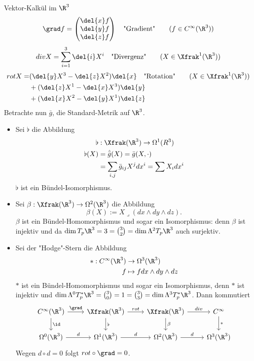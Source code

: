 \begin{rem}
	Vektor-Kalkül im $\R^3$\\
	\[ \grad f = \begin{pmatrix}
		\del{x}f \\ \del{y}f \\ \del{z}f
		\end{pmatrix} \quad \text{"Gradient"} \qquad (f \in C^\infty(\R^3)) \]
	\[ div X = \sum_{i=1}^3 \del{i} X^i \quad \text{"Divergenz"} \qquad (X \in \Xfrak^1(\R^3)) \]
	\begin{align*}
		rot X =& (\del{y}X^3 - \del{z}X^2) \del{x} \quad \text{"Rotation"} \qquad (X \in \Xfrak^1(\R^3))\\
		&+ (\del{z}X^1 - \del{x}X^3) \del{y}\\
		&+ (\del{x}X^2 - \del{y}X^1) \del{z}
	\end{align*}
	Betrachte nun $\bar{g}$, die Standard-Metrik auf $\R^3$.
	\begin{itemize}
		\item Sei $\flat$ die Abbildung
			\begin{align*}
				\flat&: \Xfrak(\R^3) \to \Omega^1(R^3)\\
				\flat(X) &= \hat{\bar{g}}(X) = \bar{g}(X,\cdot)\\
				&= \sum_{i,j} \bar{g}_{ij} X^j dx^i = \sum X_i dx^i
			\end{align*}
			$\flat$ ist ein Bündel-Isomorphismus.
		
		\item Sei $ \beta: \Xfrak(\R^3) \to \Omega^2(\R^3) $ die Abbildung
			\[ \beta(X):= X \lrcorner (dx \wedge dy \wedge dz). \]
			$\beta$ ist ein Bündel-Homomorphismus und sogar ein Isomorphismus: denn $\beta$ ist injektiv und da $\dim T_p\R^3 = 3 = \binom{3}{2} = \dim \Lambda^2 T_p\R^3$ auch surjektiv.
		
		\item Sei der "Hodge"-Stern die Abbildung
			\begin{align*}
				*: C^\infty(\R^3) &\to \Omega^3(\R^3)\\
				f &\mapsto f dx \wedge dy \wedge dz
			\end{align*}
			$*$ ist ein Bündel-Homomorphismus und sogar ein Isomorphismus, denn $*$ ist injektiv und $\dim \Lambda^0 T_p^*\R^3 = \binom{3}{0} = 1 = \binom{3}{3} = \dim \Lambda^3 T_p^*\R^3$. Dann kommutiert
			\[ \begin{tikzcd}
				C^\infty(\R^3) \arrow{r}{\grad} \arrow{d}{\id} & \Xfrak(\R^3) \arrow{r}{rot} \arrow{d}{\flat} & \Xfrak(\R^3) \arrow{r}{div} \arrow{d}{\beta} & C^\infty \arrow{d}{*}\\
				\Omega^0(\R^3) \arrow{r}{d} & \Omega^1(\R^3) \arrow{r}{d} & \Omega^2(\R^3) \arrow{r}{d} & \Omega^3(\R^3)
			\end{tikzcd} \]
			Wegen $ d \circ d = 0 $ folgt $rot \circ \grad = 0$.
	\end{itemize}
\end{rem}